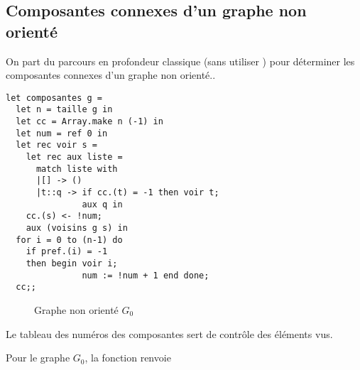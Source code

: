 \subsection{Composantes connexes d'un graphe non orienté} 
On part du parcours en profondeur classique (sans utiliser ) pour déterminer les composantes connexes d'un graphe non orienté..
\begin{lstlisting}
let composantes g = 
  let n = taille g in
  let cc = Array.make n (-1) in
  let num = ref 0 in
  let rec voir s =
    let rec aux liste = 
      match liste with
      |[] -> ()
      |t::q -> if cc.(t) = -1 then voir t;
               aux q in
    cc.(s) <- !num;
    aux (voisins g s) in
  for i = 0 to (n-1) do 
    if pref.(i) = -1 
    then begin voir i;
               num := !num + 1 end done;
  cc;;
\end{lstlisting}
\begin{figure}[ht]
\begin{center}
\caption{Graphe non orienté $G_0$}
\end{center}
\end{figure}
Le tableau des numéros des composantes sert de contrôle des éléments vus.

Pour le graphe $G_0$, la fonction renvoie \type{[|0; 1; 1; 1; 2; 2|]}
